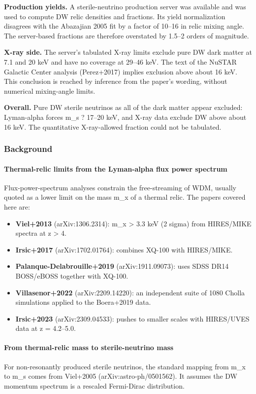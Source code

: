 \documentclass[11pt,a4paper]{article}
\begin{document}
\textbf{Production yields.} A sterile-neutrino production server was available and was used to compute DW relic densities and fractions. Its yield normalization disagrees with the Abazajian 2005 fit by a factor of 10--16 in relic mixing angle. The server-based fractions are therefore overstated by 1.5--2 orders of magnitude.

\textbf{X-ray side.} The server's tabulated X-ray limits exclude pure DW dark matter at 7.1 and 20 keV and have no coverage at 29--46 keV. The text of the NuSTAR Galactic Center analysis (Perez+2017) implies exclusion above about 16 keV. This conclusion is reached by inference from the paper's wording, without numerical mixing-angle limits.

\textbf{Overall.} Pure DW sterile neutrinos as all of the dark matter appear excluded: Lyman-alpha forces m\_s ? 17--20 keV, and X-ray data exclude DW above about 16 keV. The quantitative X-ray-allowed fraction could not be tabulated.

\subsubsection*{Background}
\paragraph{Thermal-relic limits from the Lyman-alpha flux power spectrum}
Flux-power-spectrum analyses constrain the free-streaming of WDM, usually quoted as a lower limit on the mass m\_x of a thermal relic. The papers covered here are:

\begin{itemize}
  \item \textbf{Viel+2013} (arXiv:1306.2314): m\_x \textgreater{} 3.3 keV (2 sigma) from HIRES/MIKE spectra at z \textgreater{} 4.
  \item \textbf{Irsic+2017} (arXiv:1702.01764): combines XQ-100 with HIRES/MIKE.
  \item \textbf{Palanque-Delabrouille+2019} (arXiv:1911.09073): uses SDSS DR14 BOSS/eBOSS together with XQ-100.
  \item \textbf{Villasenor+2022} (arXiv:2209.14220): an independent suite of 1080 Cholla simulations applied to the Boera+2019 data.
  \item \textbf{Irsic+2023} (arXiv:2309.04533): pushes to smaller scales with HIRES/UVES data at z = 4.2--5.0.
\end{itemize}
\paragraph{From thermal-relic mass to sterile-neutrino mass}
For non-resonantly produced sterile neutrinos, the standard mapping from m\_x to m\_s comes from Viel+2005 (arXiv:astro-ph/0501562). It assumes the DW momentum spectrum is a rescaled Fermi-Dirac distribution.
\end{document}
